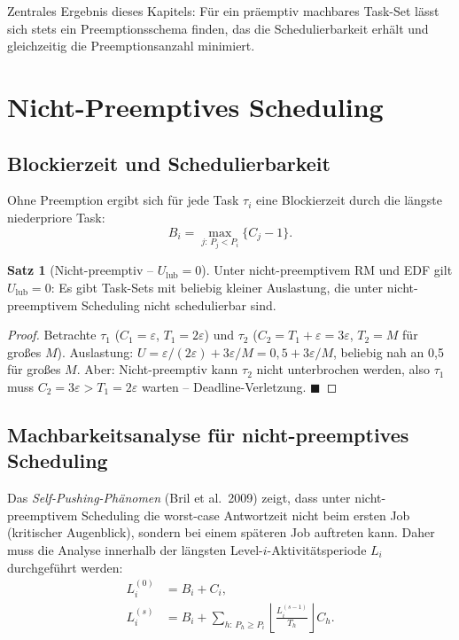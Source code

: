 ﻿\documentclass[a4paper,12pt]{report}
\theoremstyle{definition}
\newtheorem{satz}{Satz}[chapter]
\begin{document}
Zentrales Ergebnis dieses Kapitels: Für ein präemptiv machbares Task-Set lässt sich
stets ein Preemptionsschema finden, das die Schedulierbarkeit erhält und gleichzeitig
die Preemptionsanzahl minimiert.

\section{Nicht-Preemptives Scheduling}

\subsection{Blockierzeit und Schedulierbarkeit}

Ohne Preemption ergibt sich für jede Task $\tau_i$ eine Blockierzeit durch die
längste niederpriore Task:
\begin{equation}
	B_i = \max_{j:\,P_j < P_i}\{C_j - 1\}.
	\label{eq:np_blocking}
\end{equation}

\begin{satz}[Nicht-preemptiv -- $U_{\text{lub}} = 0$]
	Unter nicht-preemptivem RM und EDF gilt $U_{\text{lub}} = 0$: Es gibt Task-Sets
	mit beliebig kleiner Auslastung, die unter nicht-preemptivem Scheduling
	nicht schedulierbar sind.
\end{satz}

\begin{proof}
	Betrachte $\tau_1$ ($C_1 = \varepsilon$, $T_1 = 2\varepsilon$) und
	$\tau_2$ ($C_2 = T_1 + \varepsilon = 3\varepsilon$, $T_2 = M$ für großes $M$).
	Auslastung: $U = \varepsilon/(2\varepsilon) + 3\varepsilon/M = 0{,}5 + 3\varepsilon/M$,
	beliebig nah an 0{,}5 für großes $M$. Aber: Nicht-preemptiv kann $\tau_2$
	nicht unterbrochen werden, also $\tau_1$ muss $C_2 = 3\varepsilon > T_1 = 2\varepsilon$
	warten -- Deadline-Verletzung. \hfill$\blacksquare$
\end{proof}

\subsection{Machbarkeitsanalyse für nicht-preemptives Scheduling}

Das \emph{Self-Pushing-Phänomen} (Bril et al.\ 2009) zeigt, dass unter
nicht-preemptivem Scheduling die worst-case Antwortzeit nicht beim ersten Job
(kritischer Augenblick), sondern bei einem späteren Job auftreten kann. Daher
muss die Analyse innerhalb der längsten Level-$i$-Aktivitätsperiode $L_i$
durchgeführt werden:
\begin{align}
	L_i^{(0)} &= B_i + C_i, \nonumber\\
	L_i^{(s)} &= B_i + \sum_{h:\,P_h \geq P_i} \left\lfloor \frac{L_i^{(s-1)}}{T_h} \right\rfloor C_h.
	\label{eq:level_i_period}
\end{align}
\end{document}
